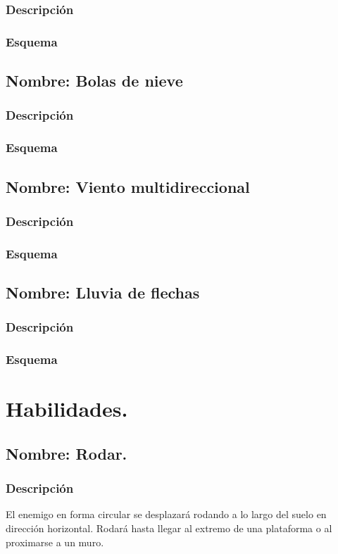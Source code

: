 \documentclass[11pt,letterpaper]{article}
\begin{document}
	\subsubsection{Descripción}
	\subsubsection{Esquema}
		\subsection{Nombre: Bolas de nieve}
	\subsubsection{Descripción}
	\subsubsection{Esquema}
		\subsection{Nombre: Viento multidireccional}
	\subsubsection{Descripción}
	\subsubsection{Esquema}
		\subsection{Nombre: Lluvia de flechas}
	\subsubsection{Descripción}
	\subsubsection{Esquema}

\section{Habilidades.}
	\subsection{Nombre: Rodar.} \label{hab.rodar}
		\subsubsection{Descripción}
		El enemigo en forma circular se desplazará rodando a lo largo del suelo en dirección horizontal.
		Rodará hasta llegar al extremo de una plataforma o al proximarse a un muro.
\end{document}
